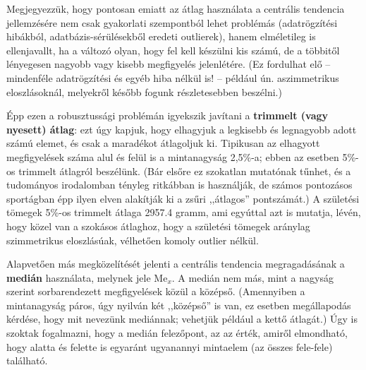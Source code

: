 \documentclass[]{book}
\begin{document}
Megjegyezzük, hogy pontosan emiatt az átlag használata a centrális tendencia jellemzésére nem csak gyakorlati szempontból lehet problémás (adatrögzítési hibákból, adatbázis-sérülésekből eredeti outlierek), hanem elméletileg is ellenjavallt, ha a változó olyan, hogy fel kell készülni kis számú, de a többitől lényegesen nagyobb vagy kisebb megfigyelés jelenlétére. (Ez fordulhat elő -- mindenféle adatrögzítési és egyéb hiba nélkül is! -- például ún. aszimmetrikus eloszlásoknál, melyekről később fogunk részletesebben beszélni.)

Épp ezen a robusztussági problémán igyekszik javítani a \textbf{trimmelt (vagy nyesett) átlag}: ezt úgy kapjuk, hogy elhagyjuk a legkisebb és legnagyobb adott számú elemet, és csak a maradékot átlagoljuk ki. Tipikusan az elhagyott megfigyelések száma alul és felül is a mintanagyság 2,5\%-a; ebben az esetben 5\%-os trimmelt átlagról beszélünk. (Bár elsőre ez szokatlan mutatónak tűnhet, és a tudományos irodalomban tényleg ritkábban is használják, de számos pontozásos sportágban épp ilyen elven alakítják ki a zsűri ,,átlagos'' pontszámát.) A születési tömegek 5\%-os trimmelt átlaga 2957.4 gramm, ami egyúttal azt is mutatja, lévén, hogy közel van a szokásos átlaghoz, hogy a születési tömegek aránylag szimmetrikus eloszlásúak, vélhetően komoly outlier nélkül.

Alapvetően más megközelítését jelenti a centrális tendencia megragadásának a \textbf{medián} használata, melynek jele \(\mathrm{Me}_x\). A medián nem más, mint a nagyság szerint sorbarendezett megfigyelések közül a középső. (Amennyiben a mintanagyság páros, úgy nyilván két ,,középső'' is van, ez esetben megállapodás kérdése, hogy mit nevezünk mediánnak; vehetjük például a kettő átlagát.) Úgy is szoktak fogalmazni, hogy a medián felezőpont, az az érték, amiről elmondható, hogy alatta és felette is egyaránt ugyanannyi mintaelem (az összes fele-fele) található.
\end{document}
